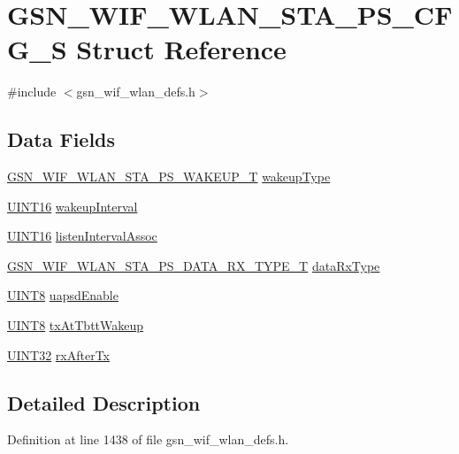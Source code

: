 \hypertarget{a00403}{
\section{GSN\_\-WIF\_\-WLAN\_\-STA\_\-PS\_\-CFG\_\-S Struct Reference}
\label{a00403}
}


{\ttfamily \#include $<$gsn\_\-wif\_\-wlan\_\-defs.h$>$}

\subsection*{Data Fields}
\begin{DoxyCompactItemize}
\item 
\hyperlink{a00677_ga87b10edb516da9c03dd06234ee6d7fd5}{GSN\_\-WIF\_\-WLAN\_\-STA\_\-PS\_\-WAKEUP\_\-T} \hyperlink{a00403_a475515ef82e53f18ec9a6b2acd649d5e}{wakeupType}
\item 
\hyperlink{a00660_ga09f1a1fb2293e33483cc8d44aefb1eb1}{UINT16} \hyperlink{a00403_a56221693a7df4c537eabf8d87ac56502}{wakeupInterval}
\item 
\hyperlink{a00660_ga09f1a1fb2293e33483cc8d44aefb1eb1}{UINT16} \hyperlink{a00403_ad5f4acb306cf6df57772afd185dc743c}{listenIntervalAssoc}
\item 
\hyperlink{a00677_ga7e3a091c3528831ca0870a266e284513}{GSN\_\-WIF\_\-WLAN\_\-STA\_\-PS\_\-DATA\_\-RX\_\-TYPE\_\-T} \hyperlink{a00403_ac49a812d216ba78e6900ff20079ea7fd}{dataRxType}
\item 
\hyperlink{a00660_gab27e9918b538ce9d8ca692479b375b6a}{UINT8} \hyperlink{a00403_a71c457b31793597927c3328c41dcdbf9}{uapsdEnable}
\item 
\hyperlink{a00660_gab27e9918b538ce9d8ca692479b375b6a}{UINT8} \hyperlink{a00403_a19d9a5087e04fd91500bafe808855fb4}{txAtTbttWakeup}
\item 
\hyperlink{a00660_gae1e6edbbc26d6fbc71a90190d0266018}{UINT32} \hyperlink{a00403_a142a0436cbf7469285e1ec2c61cbe402}{rxAfterTx}
\end{DoxyCompactItemize}


\subsection{Detailed Description}


Definition at line 1438 of file gsn\_\-wif\_\-wlan\_\-defs.h.



